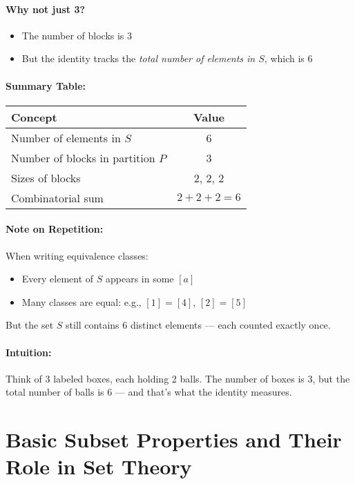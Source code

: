 \documentclass[10pt]{article}
\theoremstyle{plain}
\theoremstyle{definition}
\begin{document}
	\paragraph{Why not just 3?}
	
	\begin{itemize}
		\item The number of blocks is 3
		\item But the identity tracks the \emph{total number of elements in $S$}, which is 6
	\end{itemize}
	
	\paragraph{Summary Table:}
	
	\begin{tabular}{|l|c|}
		\hline
		\textbf{Concept} & \textbf{Value} \\
		\hline
		Number of elements in $S$ & 6 \\
		Number of blocks in partition $P$ & 3 \\
		Sizes of blocks & 2, 2, 2 \\
		Combinatorial sum & $2 + 2 + 2 = 6$ \\
		\hline
	\end{tabular}
	
	\paragraph{Note on Repetition:}
	When writing equivalence classes:
	\begin{itemize}
		\item Every element of $S$ appears in some $[a]$
		\item Many classes are equal: e.g., $[1] = [4]$, $[2] = [5]$
	\end{itemize}
	But the set $S$ still contains 6 distinct elements — each counted exactly once.
	
	\paragraph{Intuition:}
	Think of 3 labeled boxes, each holding 2 balls.  
	The number of boxes is 3, but the total number of balls is 6 — and that’s what the identity measures.
	
	
	\section*{Basic Subset Properties and Their Role in Set Theory}
	
\end{document}

